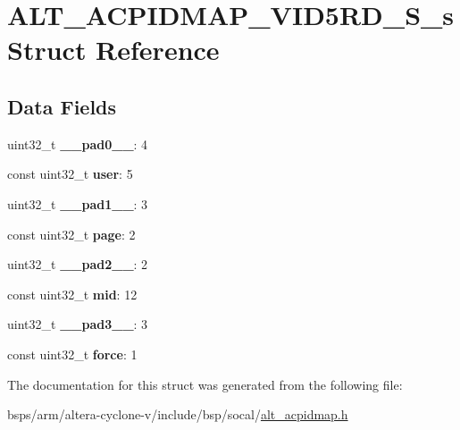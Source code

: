 \hypertarget{structALT__ACPIDMAP__VID5RD__S__s}{}\section{A\+L\+T\+\_\+\+A\+C\+P\+I\+D\+M\+A\+P\+\_\+\+V\+I\+D5\+R\+D\+\_\+\+S\+\_\+s Struct Reference}
\label{structALT__ACPIDMAP__VID5RD__S__s}
\subsection*{Data Fields}
\begin{DoxyCompactItemize}
\item 
\mbox{\label{structALT__ACPIDMAP__VID5RD__S__s_a889a76105c31521479ea3646f67c401f}} 
uint32\+\_\+t {\bfseries \+\_\+\+\_\+pad0\+\_\+\+\_\+}\+: 4
\item 
\mbox{\label{structALT__ACPIDMAP__VID5RD__S__s_aebf0a4f4c0f9879258c7dad19ac14bf4}} 
const uint32\+\_\+t {\bfseries user}\+: 5
\item 
\mbox{\label{structALT__ACPIDMAP__VID5RD__S__s_a1965ba3c2792ebf96c65aa4a70c2eaf6}} 
uint32\+\_\+t {\bfseries \+\_\+\+\_\+pad1\+\_\+\+\_\+}\+: 3
\item 
\mbox{\label{structALT__ACPIDMAP__VID5RD__S__s_afa200ff652e9e8e862e3ae7b2daea07f}} 
const uint32\+\_\+t {\bfseries page}\+: 2
\item 
\mbox{\label{structALT__ACPIDMAP__VID5RD__S__s_ae0c88b7d4176af7e5a18c0c6bed8d0c7}} 
uint32\+\_\+t {\bfseries \+\_\+\+\_\+pad2\+\_\+\+\_\+}\+: 2
\item 
\mbox{\label{structALT__ACPIDMAP__VID5RD__S__s_a3c1ebc7b2ca7ca071dbcc64a9b80e8da}} 
const uint32\+\_\+t {\bfseries mid}\+: 12
\item 
\mbox{\label{structALT__ACPIDMAP__VID5RD__S__s_aaaf44c2cce799feb3acb5ae2947062e8}} 
uint32\+\_\+t {\bfseries \+\_\+\+\_\+pad3\+\_\+\+\_\+}\+: 3
\item 
\mbox{\label{structALT__ACPIDMAP__VID5RD__S__s_a12c07095950c4dee7ace58e403be109b}} 
const uint32\+\_\+t {\bfseries force}\+: 1
\end{DoxyCompactItemize}


The documentation for this struct was generated from the following file\+:\begin{DoxyCompactItemize}
\item 
bsps/arm/altera-\/cyclone-\/v/include/bsp/socal/\mbox{\hyperlink{alt__acpidmap_8h}{alt\+\_\+acpidmap.\+h}}\end{DoxyCompactItemize}
